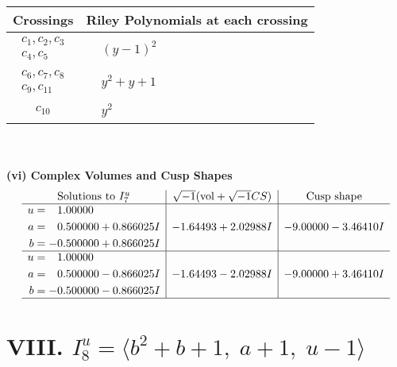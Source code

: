 \documentclass[1p]{elsarticle_modified}
\theoremstyle{definition}
\newcommand{\I}{\sqrt{-1}}
\begin{document}
\begin{tabular}{m{50pt}|m{274pt}}
Crossings & \hspace{64pt}Riley Polynomials at each crossing \\
\hline $$\begin{aligned}c_{1},c_{2},c_{3}\\c_{4},c_{5}\end{aligned}$$&$\begin{aligned}
&(y-1)^2
\end{aligned}$\\
\hline $$\begin{aligned}c_{6},c_{7},c_{8}\\c_{9},c_{11}\end{aligned}$$&$\begin{aligned}
&y^2+y+1
\end{aligned}$\\
\hline $$\begin{aligned}c_{10}\end{aligned}$$&$\begin{aligned}
&y^2
\end{aligned}$\\
\hline
\end{tabular}\\~\\
\newpage\flushleft \textbf{(vi) Complex Volumes and Cusp Shapes}
$$\begin{array}{c|c|c}  
\text{Solutions to }I^u_{7}& \I (\text{vol} + \sqrt{-1}CS) & \text{Cusp shape}\\
 \hline 
\begin{aligned}
u &= \phantom{-}1.00000\phantom{ +0.000000I} \\
a &= \phantom{-}0.500000 + 0.866025 I \\
b &= -0.500000 + 0.866025 I\end{aligned}
 & -1.64493 + 2.02988 I & -9.00000 - 3.46410 I \\ \hline\begin{aligned}
u &= \phantom{-}1.00000\phantom{ +0.000000I} \\
a &= \phantom{-}0.500000 - 0.866025 I \\
b &= -0.500000 - 0.866025 I\end{aligned}
 & -1.64493 - 2.02988 I & -9.00000 + 3.46410 I\\
 \hline 
 \end{array}$$\newpage\newpage\renewcommand{\arraystretch}{1}
\centering \section*{VIII. $I^u_{8}= \langle b^2+b+1,\;a+1,\;u-1 \rangle$}
\end{document}
